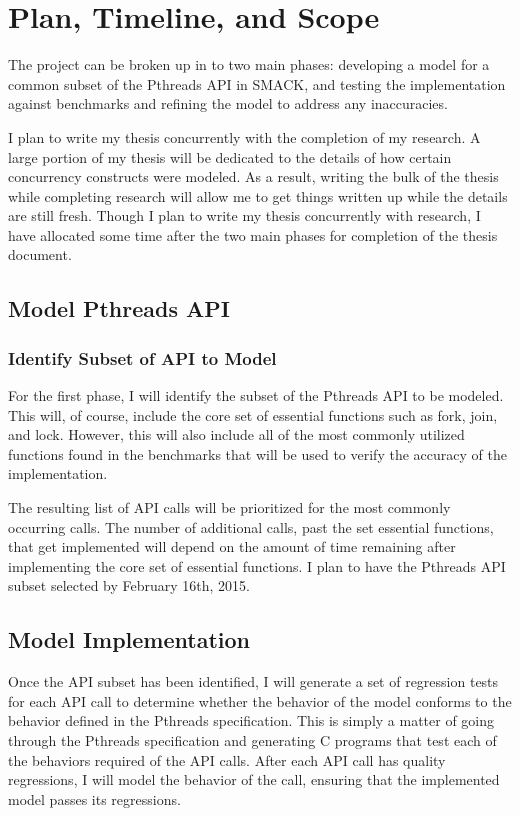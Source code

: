 \chapter{Plan, Timeline, and Scope}\label{thesis_methodology}
The project can be broken up in to two main phases: developing a model for a common subset of the Pthreads API in SMACK, and testing the implementation against benchmarks and refining the model to address any inaccuracies.

I plan to write my thesis concurrently with the completion of my research.   A large portion of my thesis will be dedicated to the details of how certain concurrency constructs were modeled.  As a result, writing the bulk of the thesis while completing research will allow me to get things written up while the details are still fresh.  Though I plan to write my thesis concurrently with research, I have allocated some time after the two main phases for completion of the thesis document.

\section{Model Pthreads API}

\subsection{Identify Subset of API to Model} 

For the first phase,  I will identify the subset of the Pthreads API to be modeled.  This will, of course, include the core set of essential functions such as fork, join, and lock.  However, this will also include all of the most commonly utilized functions found in the benchmarks that will be used to verify the accuracy of the implementation.  

The resulting list of API calls will be prioritized for the most commonly occurring calls.  The number of additional calls, past the set essential functions, that get implemented will depend on the amount of time remaining after implementing the core set of essential functions.  I plan to have the Pthreads API subset selected by February 16th, 2015.

\section{Model Implementation}

Once the API subset has been identified, I will generate a set of regression tests for each API call to determine whether the behavior of the model conforms to the behavior defined in the Pthreads specification.  This is simply a matter of going through the Pthreads specification and generating C programs that test each of the behaviors required of the API calls.  After each API call has quality regressions, I will model the behavior of the call, ensuring that the implemented model passes its regressions.

